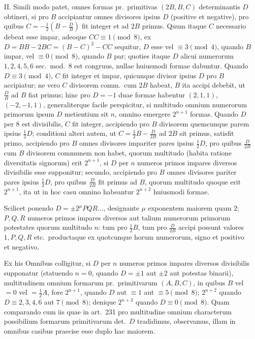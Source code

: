 \documentclass[12pt,a4paper]{article}
\theoremstyle{plain}
\theoremstyle{definition}
\theoremstyle{remark}
\theoremstyle{problemstyle}
\begin{document}
II. Simili modo patet, omnes formas pr.\ primitivas $(2B, B, C)$ determinantis $D$ obtineri, si pro $B$ accipiantur omnes divisores ipsius $D$ (positive et negative), pro quibus $C = -\frac{1}{2}(B - \frac{D}{B})$ fit integer et ad $2B$ primus. Quum itaque $C$ necessario debeat esse impar, adeoque $CC \equiv 1 \pmod{8}$, ex $D = BB - 2BC = (B - C)^2 - CC$ sequitur, $D$ esse vel $\equiv 3 \pmod{4}$, quando $B$ impar, vel $\equiv 0 \pmod{8}$, quando $B$ par; quoties itaque $D$ alicui numerorum $1, 2, 4, 5, 6$ sec.\ mod.\ $8$ est congruus, nullae huiusmodi formae dabuntur. Quando $D \equiv 3 \pmod{4}$, $C$ fit integer et impar, quicunque divisor ipsius $D$ pro $B$ accipiatur; ne vero $C$ divisorem comm.\ cum $2B$ habeat, $B$ ita accipi debebit, ut $\frac{D}{B}$ ad $B$ fiat primus; hinc pro $D = -1$ duae formae habentur $(2, 1, 1)$, $(-2, -1, 1)$, generaliterque facile perspicitur, si multitudo omnium numerorum primorum ipsum $D$ metientium sit $n$, omnino emergere $2^{n+1}$ formas. Quando $D$ per $8$ est divisibilis, $C$ fit integer, accipiendo pro $B$ divisorem quemcunque parem ipsius $\tfrac{1}{2}D$; conditioni alteri autem, ut $C = \tfrac{1}{2}B - \frac{D}{2B}$ ad $2B$ sit primus, satisfit primo, accipiendo pro $B$ omnes divisores impariter pares ipsius $\tfrac{1}{2}D$, pro quibus $\frac{D}{2B}$ cum $B$ divisorem communem non habet, quorum multitudo (habita ratione diversitatis signorum) erit $2^{n+1}$, si $D$ per $n$ numeros primos impares diversos divisibilis esse supponitur; secundo, accipiendo pro $B$ omnes divisores pariter pares ipsius $\tfrac{1}{2}D$, pro quibus $\frac{D}{2B}$ fit primus ad $B$, quorum multitudo quoque erit $2^{n+1}$, ita ut in hoc casu omnino habeantur $2^{n+2}$ huiusmodi formae.

Scilicet ponendo $D = \pm 2^\mu PQR\ldots$, designante $\mu$ exponentem maiorem quam $2$; $P, Q, R$ numeros primos impares diversos aut talium numerorum primorum potestates quorum multitudo $n$: tum pro $\tfrac{1}{2}B$, tum pro $\frac{D}{2B}$ accipi possunt valores $1, P, Q, R$ etc.\ productaque ex quotcunque horum numerorum, signo et positivo et negativo.

Ex his Omnibus colligitur, si $D$ per $n$ numeros primos impares diversos divisibilis supponatur (statuendo $n = 0$, quando $D = \pm 1$ aut $\pm 2$ aut potestas binarii), multitudinem omnium formarum pr.\ primitivarum $(A, B, C)$, in quibus $B$ vel $= 0$ vel $= \tfrac{1}{2}A$, fore $2^{n+1}$, quando $D$ aut $\equiv 1$ aut $\equiv 5 \pmod{8}$; $2^{n+2}$ quando $D \equiv 2, 3, 4, 6$ aut $7 \pmod{8}$; denique $2^{n+3}$ quando $D \equiv 0 \pmod{8}$. Quam comparando cum iis quae in art.\ 231 pro multitudine omnium characterum possibilium formarum primitivarum det.\ $D$ tradidimus, observamus, illam in omnibus casibus praecise esse duplo hac maiorem.
\end{document}
